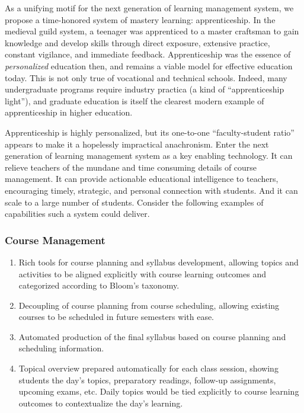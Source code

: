 \documentclass{article}
\begin{document}
As a unifying motif for the next generation of learning management system,
we propose a time-honored system of mastery learning: apprenticeship.
In the medieval guild system,
a teenager was apprenticed to a master craftsman
to gain knowledge and develop skills through
direct exposure,
extensive practice,
constant vigilance,
and immediate feedback.
Apprenticeship was the essence of \emph{personalized} education then,
and remains a viable model for effective education today.
This is not only true of vocational and technical schools.
Indeed, many undergraduate programs require
industry practica (a kind of ``apprenticeship light''),
and graduate education is itself the clearest modern example of apprenticeship
in higher education.

Apprenticeship is highly personalized,
but its one-to-one ``faculty-student ratio''
appears to make it a hopelessly impractical anachronism.
Enter the next generation of learning management system
as a key enabling technology.
It can relieve teachers
of the mundane and time consuming details
of course management.
It can provide actionable educational intelligence to teachers,
encouraging timely, strategic, and personal connection with students.
And it can scale to a large number of students.
Consider the following examples of
capabilities such a system could deliver.

\subsubsection{Course Management}
\begin{enumerate}
\item Rich tools for course planning and syllabus development, allowing topics and
  activities to be aligned explicitly with course learning outcomes and categorized
  according to Bloom's taxonomy.
\item Decoupling of course planning from course scheduling, allowing existing courses to
  be scheduled in future semesters with ease.
\item Automated production of the final syllabus based on course planning and scheduling
  information.
\item Topical overview prepared automatically for each class session, showing students the
  day's topics, preparatory readings, follow-up assignments, upcoming exams, etc.
  Daily topics would be tied explicitly to course learning outcomes
  to contextualize the day's learning.
\end{enumerate}
\end{document}
